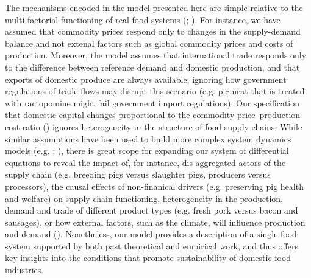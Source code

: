 \documentclass[12pt]{article}
\begin{document}
The mechanisms encoded in the model presented here are simple relative to the multi-factorial functioning of real food systems (\cite{ericksen2008}; \cite{ingram2011}). For instance, we have assumed that commodity prices respond only to changes in the supply-demand balance and not extenal factors such as global commodity prices and costs of production. Moreover, the model assumes that international trade responds only to the difference between reference demand and domestic production, and that exports of domestic produce are always available, ignoring how government regulations of trade flows may disrupt this scenario (e.g. pigmeat that is treated with ractopomine might fail government import regulations). Our specification that domestic capital changes proportional to the commodity price--production cost ratio (\cite{sterman2000}) ignores heterogeneity in the structure of food supply chains. While similar assumptions have been used to build more complex system dynamics models (e.g. \cite{meadows1971}; \cite{sterman2000}), there is great scope for expanding our system of differential equations to reveal the impact of, for instance, dis-aggregated actors of the supply chain (e.g. breeding pigs versus slaughter pigs, producers versus processors), the causal effects of non-finanical drivers (e.g. preserving pig health and welfare) on supply chain functioning, heterogeneity in the production, demand and trade of different product types (e.g. fresh pork versus bacon and sausages), or how external factors, such as the climate, will influence production and demand (\cite{vermeulen2012}). Nonetheless, our model provides a description of a single food system supported by both past theoretical and empirical work, and thus offers key insights into the conditions that promote sustainability of domestic food industries.
\end{document}
